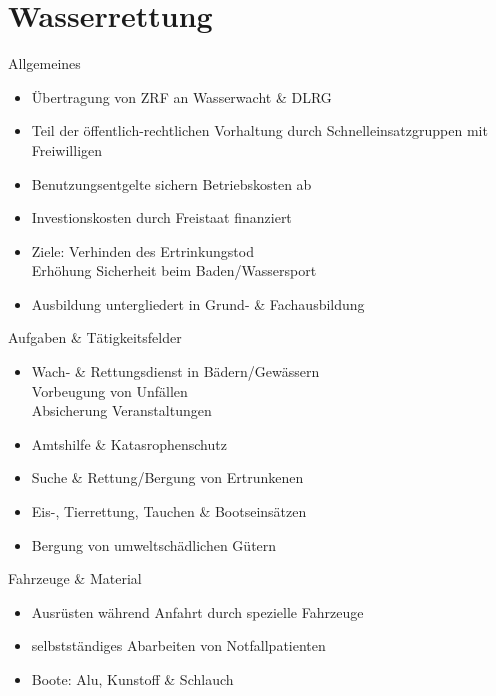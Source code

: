 \section{Wasserrettung}
\begin{sectionbox}{Allgemeines}
    \begin{itemize}
        \item Übertragung von ZRF an Wasserwacht \& DLRG
        \item Teil der öffentlich-rechtlichen Vorhaltung durch Schnelleinsatzgruppen mit Freiwilligen
        \item Benutzungsentgelte sichern Betriebskosten ab
        \item Investionskosten durch Freistaat finanziert
        \item Ziele: Verhinden des Ertrinkungstod\\
        \ra Erhöhung Sicherheit beim Baden/Wassersport
        \item Ausbildung untergliedert in Grund- \& Fachausbildung
    \end{itemize}
\end{sectionbox}
\begin{sectionbox}{Aufgaben \& Tätigkeitsfelder}
    \begin{itemize}
        \item Wach- \& Rettungsdienst in Bädern/Gewässern\\
        \ra Vorbeugung von Unfällen\\
        \ra Absicherung Veranstaltungen
        \item Amtshilfe \& Katasrophenschutz
        \item Suche \& Rettung/Bergung von Ertrunkenen
        \item Eis-, Tierrettung, Tauchen \& Bootseinsätzen
        \item Bergung von umweltschädlichen Gütern
    \end{itemize}
\end{sectionbox}
\begin{sectionbox}{Fahrzeuge \& Material}
    \begin{itemize}
        \item Ausrüsten während Anfahrt durch spezielle Fahrzeuge
        \item selbstständiges Abarbeiten von Notfallpatienten
        \item Boote: Alu, Kunstoff \& Schlauch
    \end{itemize}
\end{sectionbox}